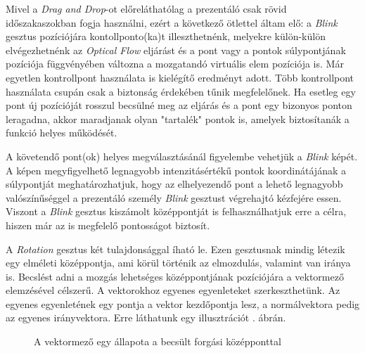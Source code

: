 Mivel a \textit{Drag and Drop}-ot előreláthatólag a prezentáló csak rövid időszakaszokban fogja használni, ezért a következő ötlettel áltam elő: a \textit{Blink} gesztus pozíciójára kontollponto(ka)t illeszthetnénk, melyekre külön-külön elvégezhetnénk az \textit{Optical Flow} eljárást és a pont vagy a pontok súlypontjának pozíciója függvényében változna a mozgatandó virtuális elem pozíciója is. Már egyetlen kontrollpont használata is kielégítő eredményt adott. Több kontrollpont használata csupán csak a biztonság érdekében tűnik megfelelőnek. Ha esetleg egy pont új pozícióját rosszul becsülné meg az eljárás és a pont egy bizonyos ponton leragadna, akkor maradjanak olyan "tartalék" pontok is, amelyek biztosítanák a funkció helyes működését.

A követendő pont(ok) helyes megválasztásánál figyelembe vehetjük a \textit{Blink} képét. A képen megyfigyelhető legnagyobb intenzitásértékű pontok koordinátájának a súlypontját meghatározhatjuk, hogy az elhelyezendő pont a lehető legnagyobb valószínűséggel a prezentáló személy \textit{Blink} gesztust végrehajtó kézfejére essen. Viszont a \textit{Blink} gesztus kiszámolt középpontját is felhasználhatjuk erre a célra, hiszen már az is megfelelő pontosságot biztosít.


A \textit{Rotation} gesztus két tulajdonsággal íható le. Ezen gesztusnak mindig létezik egy elméleti középpontja, ami körül történik az elmozdulás, valamint van iránya is.
Becslést adni a mozgás lehetséges középpontjának pozíciójára a vektormező elemzésével célszerű.
A vektorokhoz egyenes egyenleteket szerkeszthetünk. Az egyenes egyenletének egy pontja a vektor kezdőpontja lesz, a normálvektora pedig az egyenes irányvektora. Erre láthatunk egy illusztrációt . ábrán.

\begin{figure}[h]
\centering
{}
\caption{A vektormező egy állapota a becsült forgási középponttal}
\label{fig:rotation}
\end{figure}


